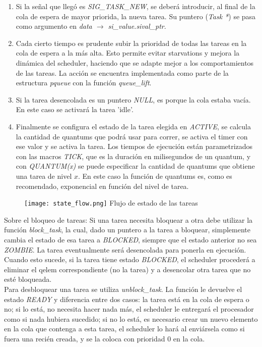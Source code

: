 \documentclass[a4paper]{article}
\begin{document}
\begin{enumerate}
    \item Si la señal que llegó es \textit{SIG\_TASK\_NEW}, se deberá
    introducir, al final de la cola de espera de mayor priorida, la
    nueva tarea. Su puntero (\textit{Task *}) se pasa como argumento
    en \textit{data $\to$ si\_value.sival\_ptr}.
    \item Cada cierto tiempo es prudente subir la prioridad de todas
    las tareas en la cola de espera a la más alta. Esto permite
    evitar starvations y mejora la dinámica del scheduler, haciendo
    que se adapte mejor a los comportamientos de las tareas. La
    acción se encuentra implementada como parte de la estructura
    \textit{pqueue} con la función \textit{queue\_lift}.
    \item Si la tarea desencolada es un puntero \textit{NULL}, es porque
    la cola estaba vac\'ia. En este caso se activar\'a la tarea 'idle'.
    \item Finalmente se configura el estado de la tarea elegida en
    \textit{ACTIVE}, se calcula la cantidad de quantums que podrá
    usar para correr, se activa el timer con ese valor y se activa
    la tarea. Los tiempos de ejecución están parametrizados con
    las macros \textit{TICK}, que es la duración en milisegundos
    de un quantum, y con \textit{QUANTUM(x)} se puede especificar
    la cantidad de quantums que obtiene una tarea de nivel $x$.
    En este caso la función de quantums es, como es recomendado,
    exponencial en función del nivel de tarea.
\end{enumerate}

\begin{figure}[H]
    \begin{center}
        \texttt{[image: state\_flow.png]}
        Flujo de estado de las tareas
    \end{center}
\end{figure}

Sobre el bloqueo de tareas: Si una tarea necesita bloquear a otra
debe utilizar la función \textit{block\_task}, la cual, dado un
puntero a la tarea a bloquear, simplemente cambia el estado de esa
tarea a \textit{BLOCKED}, siempre que el estado anterior no sea
\textit{ZOMBIE}. La tarea eventualmente ser\'a desencolada para ponerla
en ejecuci\'on. Cuando esto sucede, si la tarea tiene estado
\textit{BLOCKED}, el scheduler procederá a eliminar el qelem
correspondiente (no la tarea) y a desencolar otra tarea que no
esté bloqueada.\\
Para desbloquear una tarea se utiliza \textit{unblock\_task}.
La función le devuelve el estado
\textit{READY} y diferencia entre dos casos: la tarea está en la
cola de espera o no; si lo está, no necesita hacer nada más, el
scheduler le entregará el procesador como si nada hubiera
sucedido; si no lo está, es necesario crear un nuevo elemento
en la cola que contenga a esta tarea, el scheduler lo hará al
enviársela como si fuera una recién creada, y se la coloca con
prioridad 0 en la cola.
\end{document}
